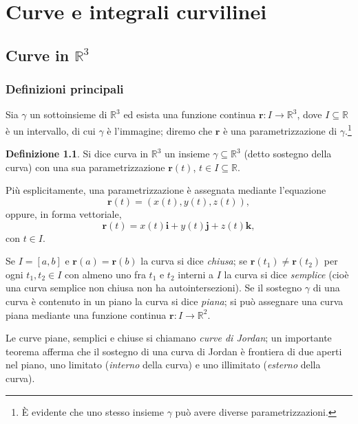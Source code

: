 \documentclass[a4paper]{book}
\numberwithin{equation}{section}
\theoremstyle{plain}
\theoremstyle{definition}
\newtheorem{defn}{Definizione}[section]
\theoremstyle{remark}
\renewcommand{\vec}{\boldsymbol}
\theoremstyle{example}
\begin{document}
\chapter{Curve e integrali curvilinei}

\section{Curve in $\mathbb{R}^3$}
\subsection{Definizioni principali}
Sia $\gamma$ un sottoinsieme di $\mathbb{R}^3$ ed esista una funzione continua $\vec{r}\colon \!I \to \mathbb{R}^3$, dove $I \subseteq \mathbb{R}$ è un intervallo, di cui $\gamma$ è l'immagine; diremo che $\vec{r}$ è una parametrizzazione di $\gamma$.\footnote{È evidente che uno stesso insieme $\gamma$ può avere diverse parametrizzazioni.}

\begin{defn}
Si dice curva in $\mathbb{R}^3$ un insieme $\gamma \subseteq \mathbb{R}^3$ (detto sostegno della curva) con una sua parametrizzazione $\vec{r}(t)$, $t \in I \subseteq \mathbb{R}$.
\end{defn}

Più esplicitamente, una parametrizzazione è assegnata mediante l'equazione
	\begin{equation*}
	\vec{r}(t) = (x(t), y(t), z(t)),
	\end{equation*}
oppure, in forma vettoriale,
	\begin{equation*}
	\vec{r}(t) = x(t)\vec{i} + y(t)\vec{j} + z(t)\vec{k},
	\end{equation*}
con $t \in I$.

Se $I = [a, b]$ e $\vec{r}(a) = \vec{r}(b)$ la curva si dice \emph{chiusa}; se $\vec{r}(t_1) \ne \vec{r}(t_2)$ per ogni $t_1, t_2 \in I$ con almeno uno fra $t_1$ e $t_2$ interni a $I$ la curva si dice \emph{semplice} (cioè una curva semplice non chiusa non ha autointersezioni). Se il sostegno $\gamma$ di una curva è contenuto in un piano la curva si dice \emph{piana}; si può assegnare una curva piana mediante una funzione continua $\vec{r} \colon \! I \to \mathbb{R}^2$.

Le curve piane, semplici e chiuse si chiamano \emph{curve di Jordan}; un importante teorema afferma che il sostegno di una curva di Jordan è frontiera di due aperti nel piano, uno limitato (\emph{interno} della curva) e uno illimitato (\emph{esterno} della curva).
\end{document}

